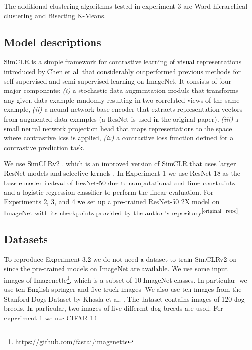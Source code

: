 The additional clustering algorithms tested in experiment 3 are Ward hierarchical clustering and Bisecting K-Means.

    \subsection{Model descriptions}
    SimCLR is a simple framework
    for contrastive learning of visual representations introduced by Chen et al. \cite{simclr} that considerably outperformed previous
    methods for self-supervised and semi-supervised
    learning on ImageNet. It consists of four major components: \textit{(i)} a stochastic data augmentation module that transforms
    any given data example randomly resulting in two correlated views of the same example, \textit{(ii)} a neural network base encoder 
    that extracts representation vectors from augmented data examples (a ResNet \cite{he2016deep} is used in the original paper), \textit{(iii)} a small neural network projection head 
    that maps
    representations to the space where contrastive loss is
    applied, \textit{(iv)} a contrastive loss function defined for a contrastive prediction task.

    We use SimCLRv2 \cite{chen2020big}, which is an improved version of SimCLR \cite{simclr} that uses larger ResNet \cite{he2016deep} models and selective kernels \cite{li2019selective}.
    In Experiment 1 we use ResNet-18 as the base encoder instead of ResNet-50 due to computational and time constraints, and a logistic regression classifier to perform the linear evaluation. For Experiments 2, 3, and 4 we set up a pre-trained ResNet-50 2X model on ImageNet with its checkpoints provided by the author's repository\textsuperscript{\ref{original_repo}}.

    \subsection{Datasets}
    To reproduce Experiment 3.2 we do not need a dataset to train SimCLRv2 on since the pre-trained models on ImageNet are available. We use some input images of Imagenette\footnote{https://github.com/fastai/imagenette}, which is a subset of 10 ImageNet classes. In particular, we use ten English springer and five truck images. We also use ten images from the Stanford Dogs Dataset by Khosla et al. \cite{KhoslaYaoJayadevaprakashFeiFei_FGVC2011}. The dataset contains images of 120 dog breeds. In particular, two images of five different dog breeds are used. For experiment 1 we use CIFAR-10 \cite{krizhevsky2010cifar}. 
    
